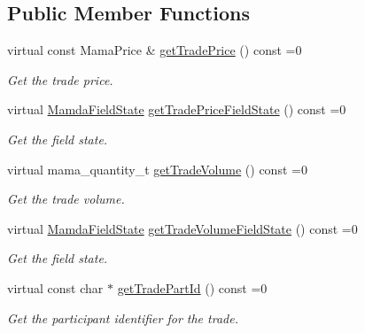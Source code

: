 \subsection*{Public Member Functions}
\begin{CompactItemize}
\item 
virtual const Mama\-Price \& \hyperlink{classWombat_1_1MamdaTradeOutOfSequence_30fc1ebb7bdf21628684797d5dd7b9c0}{get\-Trade\-Price} () const =0
\begin{CompactList}\small\item\em Get the trade price. \item\end{CompactList}\item 
virtual \hyperlink{namespaceWombat_93aac974f2ab713554fd12a1fa3b7d2a}{Mamda\-Field\-State} \hyperlink{classWombat_1_1MamdaTradeOutOfSequence_7ff7270f7dca5635214db31cd5c43ff6}{get\-Trade\-Price\-Field\-State} () const =0
\begin{CompactList}\small\item\em Get the field state. \item\end{CompactList}\item 
virtual mama\_\-quantity\_\-t \hyperlink{classWombat_1_1MamdaTradeOutOfSequence_6a7547c47304b1362c3f7df2a5529e2a}{get\-Trade\-Volume} () const =0
\begin{CompactList}\small\item\em Get the trade volume. \item\end{CompactList}\item 
virtual \hyperlink{namespaceWombat_93aac974f2ab713554fd12a1fa3b7d2a}{Mamda\-Field\-State} \hyperlink{classWombat_1_1MamdaTradeOutOfSequence_de62230d558877aa0a350b8842c1d5e1}{get\-Trade\-Volume\-Field\-State} () const =0
\begin{CompactList}\small\item\em Get the field state. \item\end{CompactList}\item 
virtual const char $\ast$ \hyperlink{classWombat_1_1MamdaTradeOutOfSequence_96b795f0456fc3b4f706b6688898e27f}{get\-Trade\-Part\-Id} () const =0
\begin{CompactList}\small\item\em Get the participant identifier for the trade. \item\end{CompactList}\item 

\end{CompactItemize}
